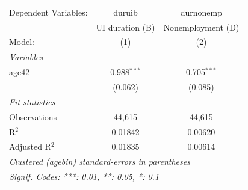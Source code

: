 
\begingroup
\centering
\begin{tabular}{lcc}
   \tabularnewline \midrule \midrule
   Dependent Variables: & duruib          & durnonemp\\  
                        & UI duration (B) & Nonemployment (D) \\   
   Model:               & (1)             & (2)\\  
   \midrule
   \emph{Variables}\\
   age42                & 0.988$^{***}$   & 0.705$^{***}$\\   
                        & (0.062)         & (0.085)\\   
   \midrule
   \emph{Fit statistics}\\
   Observations         & 44,615          & 44,615\\  
   R$^2$                & 0.01842         & 0.00620\\  
   Adjusted R$^2$       & 0.01835         & 0.00614\\  
   \midrule \midrule
   \multicolumn{3}{l}{\emph{Clustered (agebin) standard-errors in parentheses}}\\
   \multicolumn{3}{l}{\emph{Signif. Codes: ***: 0.01, **: 0.05, *: 0.1}}\\
\end{tabular}
\par\endgroup


